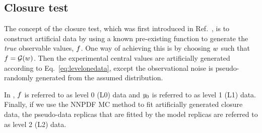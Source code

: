 \subsection{Closure test}
\label{sec:closure-test-intro}

The concept of the closure test, which was first introduced in
Ref.~\cite{nnpdf30}, is to construct artificial data by using a known
pre-existing function to generate the {\em true} observable values, $f$. One
way of achieving this is by choosing $w$ such that $f =
\mathcal{G}(w)$. Then the experimental central values are artificially
generated according to Eq.~\ref{eq:levelonedata}, except the observational noise
is pseudo-randomly generated from the assumed distribution.

In \cite{nnpdf30}, $f$ is referred to as level 0 (L0) data and
$y_0$ is referred to as level 1 (L1) data. Finally, if we use the
NNPDF MC method to fit artificially generated closure data, the pseudo-data
replicas that are fitted by the model replicas are referred to as level 2 (L2)
data.

